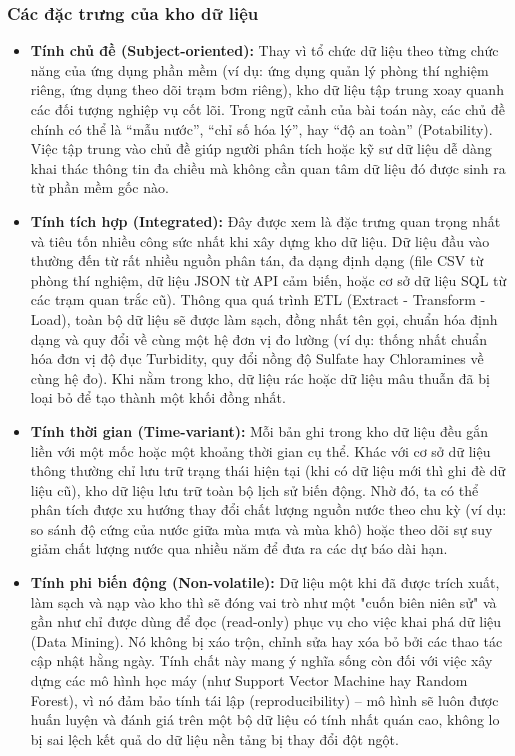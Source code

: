 \subsubsection{Các đặc trưng của kho dữ liệu}
\begin{itemize}
    \item \textbf{Tính chủ đề (Subject-oriented):} Thay vì tổ chức dữ liệu theo từng chức năng của ứng dụng phần mềm (ví dụ: ứng dụng quản lý phòng thí nghiệm riêng, ứng dụng theo dõi trạm bơm riêng), kho dữ liệu tập trung xoay quanh các đối tượng nghiệp vụ cốt lõi. Trong ngữ cảnh của bài toán này, các chủ đề chính có thể là ``mẫu nước'', ``chỉ số hóa lý'', hay ``độ an toàn'' (Potability). Việc tập trung vào chủ đề giúp người phân tích hoặc kỹ sư dữ liệu dễ dàng khai thác thông tin đa chiều mà không cần quan tâm dữ liệu đó được sinh ra từ phần mềm gốc nào.
    
    \item \textbf{Tính tích hợp (Integrated):} Đây được xem là đặc trưng quan trọng nhất và tiêu tốn nhiều công sức nhất khi xây dựng kho dữ liệu. Dữ liệu đầu vào thường đến từ rất nhiều nguồn phân tán, đa dạng định dạng (file CSV từ phòng thí nghiệm, dữ liệu JSON từ API cảm biến, hoặc cơ sở dữ liệu SQL từ các trạm quan trắc cũ). Thông qua quá trình ETL (Extract - Transform - Load), toàn bộ dữ liệu sẽ được làm sạch, đồng nhất tên gọi, chuẩn hóa định dạng và quy đổi về cùng một hệ đơn vị đo lường (ví dụ: thống nhất chuẩn hóa đơn vị độ đục Turbidity, quy đổi nồng độ Sulfate hay Chloramines về cùng hệ đo). Khi nằm trong kho, dữ liệu rác hoặc dữ liệu mâu thuẫn đã bị loại bỏ để tạo thành một khối đồng nhất.
    
    \item \textbf{Tính thời gian (Time-variant):} Mỗi bản ghi trong kho dữ liệu đều gắn liền với một mốc hoặc một khoảng thời gian cụ thể. Khác với cơ sở dữ liệu thông thường chỉ lưu trữ trạng thái hiện tại (khi có dữ liệu mới thì ghi đè dữ liệu cũ), kho dữ liệu lưu trữ toàn bộ lịch sử biến động. Nhờ đó, ta có thể phân tích được xu hướng thay đổi chất lượng nguồn nước theo chu kỳ (ví dụ: so sánh độ cứng của nước giữa mùa mưa và mùa khô) hoặc theo dõi sự suy giảm chất lượng nước qua nhiều năm để đưa ra các dự báo dài hạn.
    
    \item \textbf{Tính phi biến động (Non-volatile):} Dữ liệu một khi đã được trích xuất, làm sạch và nạp vào kho thì sẽ đóng vai trò như một "cuốn biên niên sử" và gần như chỉ được dùng để đọc (read-only) phục vụ cho việc khai phá dữ liệu (Data Mining). Nó không bị xáo trộn, chỉnh sửa hay xóa bỏ bởi các thao tác cập nhật hằng ngày. Tính chất này mang ý nghĩa sống còn đối với việc xây dựng các mô hình học máy (như Support Vector Machine hay Random Forest), vì nó đảm bảo tính tái lập (reproducibility) – mô hình sẽ luôn được huấn luyện và đánh giá trên một bộ dữ liệu có tính nhất quán cao, không lo bị sai lệch kết quả do dữ liệu nền tảng bị thay đổi đột ngột.
\end{itemize}

